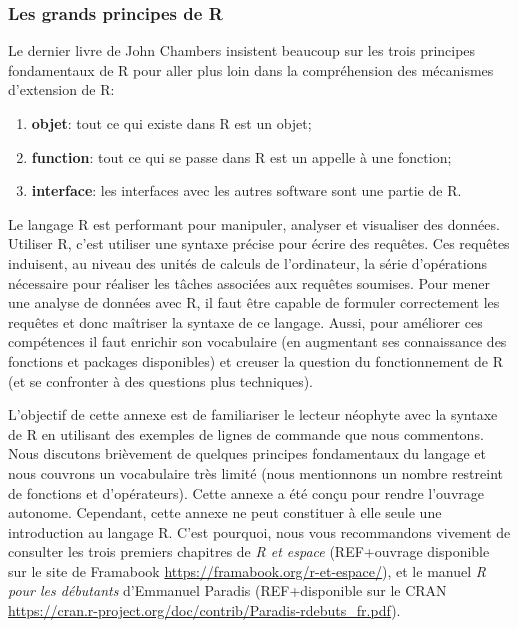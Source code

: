 \documentclass[]{article}
\providecommand{\tightlist}{%
  \setlength{\itemsep}{0pt}\setlength{\parskip}{0pt}}
\begin{document}
\hypertarget{les-grands-principes-de-r}{%
\subsubsection{Les grands principes de R}\label{les-grands-principes-de-r}}

Le dernier livre de John Chambers \citep{chambers_extending_2016} insistent beaucoup
sur les trois principes fondamentaux de R pour aller plus loin dans
la compréhension des mécanismes d'extension de R:

\begin{enumerate}
\def\labelenumi{\arabic{enumi}.}
\tightlist
\item
  \textbf{objet}: tout ce qui existe dans R est un objet;
\item
  \textbf{function}: tout ce qui se passe dans R est un appelle à une fonction;
\item
  \textbf{interface}: les interfaces avec les autres software sont une partie de R.
\end{enumerate}

Le langage R est performant pour manipuler, analyser et visualiser des données.
Utiliser R, c'est utiliser une syntaxe précise pour écrire des requêtes. Ces
requêtes induisent, au niveau des unités de calculs de l'ordinateur, la série
d'opérations nécessaire pour réaliser les tâches associées aux requêtes soumises.
Pour mener une analyse de données avec R, il faut être capable de formuler
correctement les requêtes et donc maîtriser la syntaxe de ce langage. Aussi,
pour améliorer ces compétences il faut enrichir son vocabulaire (en augmentant
ses connaissance des fonctions et packages disponibles) et creuser la question
du fonctionnement de R (et se confronter à des questions plus techniques).

L'objectif de cette annexe est de familiariser le lecteur néophyte avec
la syntaxe de R en utilisant des exemples de lignes de commande que nous
commentons. Nous discutons brièvement de quelques principes fondamentaux
du langage et nous couvrons un vocabulaire très limité (nous mentionnons un
nombre restreint de fonctions et d'opérateurs). Cette annexe a été conçu pour
rendre l'ouvrage autonome. Cependant, cette annexe ne peut constituer à elle
seule une introduction au langage R. C'est pourquoi, nous vous recommandons
vivement de consulter les trois premiers chapitres de \emph{R et espace}
(REF+ouvrage disponible sur le site de Framabook \url{https://framabook.org/r-et-espace/}),
et le manuel \emph{R pour les débutants} d'Emmanuel Paradis (REF+disponible sur le CRAN \url{https://cran.r-project.org/doc/contrib/Paradis-rdebuts_fr.pdf}).
\end{document}
